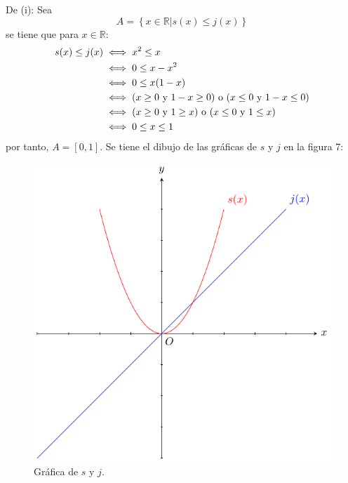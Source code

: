 \documentclass[12pt]{article}
\begin{document}
\begin{enumerate}
    \begin{sol}
        De (i): Sea
        \begin{equation*}
            A=\left\{x\in\mathbb{R}\Big|s(x)\leq j(x) \right\}
        \end{equation*}
        se tiene que para $x\in\mathbb{R}$:
        \begin{equation*}
            \begin{split}
                s(x)\leq j(x)&\iff x^2\leq x\\
                &\iff 0\leq x-x^2 \\
                &\iff 0\leq x(1-x)\\
                &\iff (x\geq0\textup{ y }1-x\geq0)\textup{ o }(x\leq0\textup{ y }1-x\leq0)\\
                &\iff (x\geq0\textup{ y }1\geq x)\textup{ o }(x\leq0\textup{ y }1\leq x)\\
                &\iff 0\leq x\leq 1 \\
            \end{split}
        \end{equation*}
        por tanto, $A=[0,1]$. Se tiene el dibujo de las gráficas de $s$ y $j$ en la figura 7:
        \begin{figure}
            \begin{center}
                \includegraphics[scale=1]{images/3_11_1.pdf}
            \end{center}
            \caption{Gráfica de $s$ y $j$.}
        \end{figure}


\end{sol}
\end{enumerate}
\end{document}
